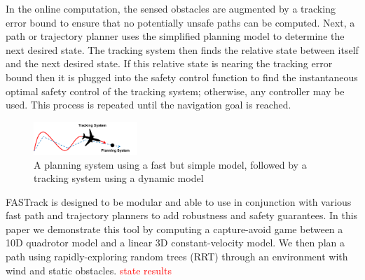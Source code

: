 In the online computation, the sensed obstacles are augmented by a tracking error bound to ensure that no potentially unsafe paths can be computed. Next, a path or trajectory planner uses the simplified planning model to determine the next desired state. The tracking system then finds the relative state between itself and the next desired state. If this relative state is nearing the tracking error bound then it is plugged into the safety control function to find the instantaneous optimal safety control of the tracking system; otherwise, any controller may be used. This process is repeated until the navigation goal is reached. 
  

\begin{figure}
	\centering
	\includegraphics[width=0.35\textwidth]{fig/chasing}
	\caption{A planning system using a fast but simple model, followed by a tracking system using a dynamic model}
	\label{fig:chasing}
	\vspace{-.2in}
\end{figure}
%
FASTrack is designed to be modular and able to use in conjunction with various fast path and trajectory planners to add robustness and safety guarantees. In this paper we demonstrate this tool by computing a capture-avoid game between a 10D quadrotor model and a linear 3D constant-velocity model. We then plan a path using rapidly-exploring random trees (RRT) through an environment with wind and static obstacles. \textcolor{red}{state results}

